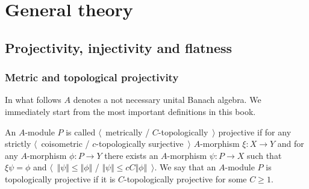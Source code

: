 
\chapter{General theory}\label{ChapterGeneralTheory} 



\section{
    Projectivity, injectivity and flatness
}\label{SectionProjectivityInjectivityAndFlatness}



\subsection{
    Metric and topological projectivity
}\label{SubSectionMetricAndTopologicalProjectivity}

In what follows $A$ denotes a not necessary unital Banach algebra. We
immediately start from the most important definitions in this book.

\begin{definition}\label{MetCTopProjMod} 
An $A$-module $P$ is 
called $\langle$~metrically / $C$-topologically~$\rangle$ projective if for any 
strictly $\langle$~coisometric / $c$-topologically surjective~$\rangle$
$A$-morphism $\xi:X\to Y$ and for any $A$-morphism $\phi:P\to Y$ 
there exists an $A$-morphism $\psi:P\to X$ such that $\xi\psi=\phi$  and
$\langle$~$\Vert\psi\Vert\leq\Vert\phi\Vert$ / 
$\Vert \psi\Vert\leq c C\Vert\phi\Vert$~$\rangle$. We say that an $A$-module 
$P$ is topologically projective if it is $C$-topologically projective for 
some $C\geq 1$.
\end{definition}

